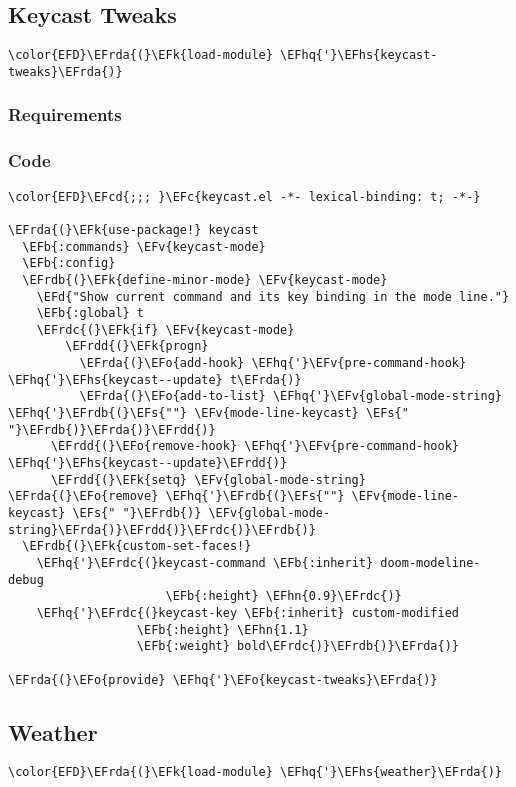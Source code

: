 \documentclass[a4wide,10pt]{article}
\newcommand{\EFc}[1]{\textcolor{EFc}{#1}} %
\newcommand{\EFcd}[1]{\textcolor{EFcd}{#1}} %
\newcommand{\EFs}[1]{\textcolor{EFs}{#1}} %
\newcommand{\EFd}[1]{\textcolor{EFd}{#1}} %
\newcommand{\EFk}[1]{\textcolor{EFk}{#1}} %
\newcommand{\EFb}[1]{\textcolor{EFb}{#1}} %
\newcommand{\EFv}[1]{\textcolor{EFv}{#1}} %
\newcommand{\EFo}[1]{\textcolor{EFo}{#1}} %
\newcommand{\EFhn}[1]{\textcolor{EFhn}{\textbf{#1}}} %
\newcommand{\EFhq}[1]{\textcolor{EFhq}{#1}} %
\newcommand{\EFhs}[1]{\textcolor{EFhs}{#1}} %
\newcommand{\EFrda}[1]{\textcolor{EFrda}{#1}} %
\newcommand{\EFrdb}[1]{\textcolor{EFrdb}{#1}} %
\newcommand{\EFrdc}[1]{\textcolor{EFrdc}{#1}} %
\newcommand{\EFrdd}[1]{\textcolor{EFrdd}{#1}} %
\begin{document}
\subsection{Keycast Tweaks}
\label{sec:orgd02887b}
\begin{Code}
\begin{Verbatim}
\color{EFD}\EFrda{(}\EFk{load-module} \EFhq{'}\EFhs{keycast-tweaks}\EFrda{)}
\end{Verbatim}
\end{Code}
\subsubsection{Requirements}
\label{sec:org980cad5}
\subsubsection{Code}
\label{sec:org23abfeb}
\begin{Code}
\begin{Verbatim}
\color{EFD}\EFcd{;;; }\EFc{keycast.el -*- lexical-binding: t; -*-}

\EFrda{(}\EFk{use-package!} keycast
  \EFb{:commands} \EFv{keycast-mode}
  \EFb{:config}
  \EFrdb{(}\EFk{define-minor-mode} \EFv{keycast-mode}
    \EFd{"Show current command and its key binding in the mode line."}
    \EFb{:global} t
    \EFrdc{(}\EFk{if} \EFv{keycast-mode}
        \EFrdd{(}\EFk{progn}
          \EFrda{(}\EFo{add-hook} \EFhq{'}\EFv{pre-command-hook} \EFhq{'}\EFhs{keycast--update} t\EFrda{)}
          \EFrda{(}\EFo{add-to-list} \EFhq{'}\EFv{global-mode-string} \EFhq{'}\EFrdb{(}\EFs{""} \EFv{mode-line-keycast} \EFs{" "}\EFrdb{)}\EFrda{)}\EFrdd{)}
      \EFrdd{(}\EFo{remove-hook} \EFhq{'}\EFv{pre-command-hook} \EFhq{'}\EFhs{keycast--update}\EFrdd{)}
      \EFrdd{(}\EFk{setq} \EFv{global-mode-string} \EFrda{(}\EFo{remove} \EFhq{'}\EFrdb{(}\EFs{""} \EFv{mode-line-keycast} \EFs{" "}\EFrdb{)} \EFv{global-mode-string}\EFrda{)}\EFrdd{)}\EFrdc{)}\EFrdb{)}
  \EFrdb{(}\EFk{custom-set-faces!}
    \EFhq{'}\EFrdc{(}keycast-command \EFb{:inherit} doom-modeline-debug
                      \EFb{:height} \EFhn{0.9}\EFrdc{)}
    \EFhq{'}\EFrdc{(}keycast-key \EFb{:inherit} custom-modified
                  \EFb{:height} \EFhn{1.1}
                  \EFb{:weight} bold\EFrdc{)}\EFrdb{)}\EFrda{)}

\EFrda{(}\EFo{provide} \EFhq{'}\EFo{keycast-tweaks}\EFrda{)}
\end{Verbatim}
\end{Code}
\subsection{Weather}
\label{sec:orgd031e45}
\begin{Code}
\begin{Verbatim}
\color{EFD}\EFrda{(}\EFk{load-module} \EFhq{'}\EFhs{weather}\EFrda{)}
\end{Verbatim}
\end{Code}
\end{document}
